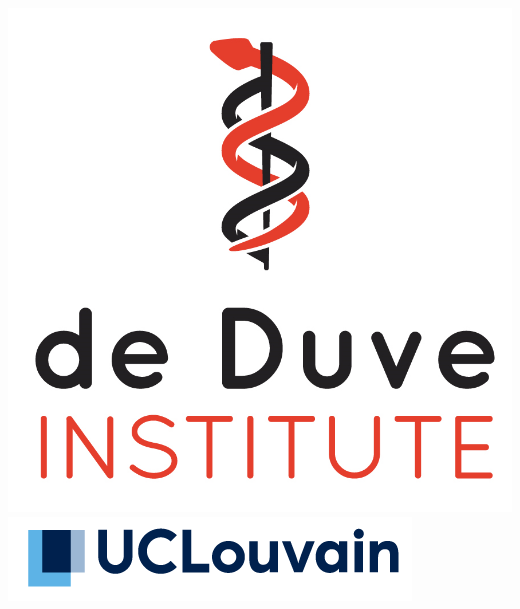 \documentclass{article}
\begin{document}
\begin{center}
{\begin{minipage}{3.7cm}
      \includegraphics[width=0.7\linewidth, right]{figs/deduve.png} \\
      \vspace{0.5cm}
      \includegraphics[width=1.1\linewidth, right]{figs/ucl.png}
  \end{minipage}
}
\end{center}

\end{document}
